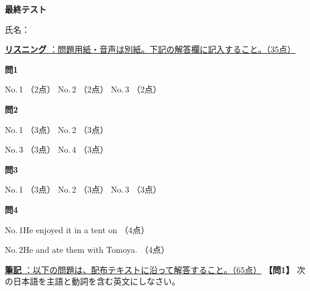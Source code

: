 
\begin{center}
{\Large\textbf{最終テスト}}
\end{center}
\vspace{0.15em}
\begin{flushright}
氏名：\testnameblank
\end{flushright}
\vspace{0.25em}
{\underline{\large\noindent\textbf{リスニング} ：問題用紙・音声は別紙。下記の解答欄に記入すること。（35点）}}
\vspace{0.5em}

\noindent\textbf{問1}
\vspace{0.4em}

\noindent
No.\,1 \listeningchoice[ア]{3.2em}（2点）\qquad
No.\,2 \listeningchoice[ウ]{3.2em}（2点）\qquad
No.\,3 \listeningchoice[ア]{3.2em}（2点）
\testqseplistening

\noindent\textbf{問2}
\vspace{0.4em}

\noindent
No.\,1 \listeningchoice[エ]{3.2em}（3点）\qquad
No.\,2 \listeningchoice[イ]{3.2em}（3点）

\vspace{0.75em}

\noindent
No.\,3 \listeningchoice[ア]{3.2em}（3点）\qquad
No.\,4 \listeningchoice[ウ]{3.2em}（3点）
\testqseplistening

\noindent\textbf{問3}
\vspace{0.4em}

\noindent
No.\,1 \listeningchoice[イ]{3.2em}（3点）\qquad
No.\,2 \listeningchoice[ウ]{3.2em}（3点）\qquad
No.\,3 \listeningchoice[エ]{3.2em}（3点）
\testqseplistening

\noindent\textbf{問4}
\vspace{0.4em}
\listeningqFourBlankSetup

\noindent No.\,1\quad He enjoyed it in a tent on  （4点）

\vspace{1em}

\noindent No.\,2\quad He  and ate them with Tomoya. （4点）

\testsectsep\vspace{1.5em}
\underline{\large\noindent\textbf{筆記} ：以下の問題は、配布テキストに沿って解答すること。（65点）}
\vspace{0.35em}
\testsectsep
\testquestion
\noindent\textbf{【問1】} 次の日本語を主語と動詞を含む英文にしなさい。

